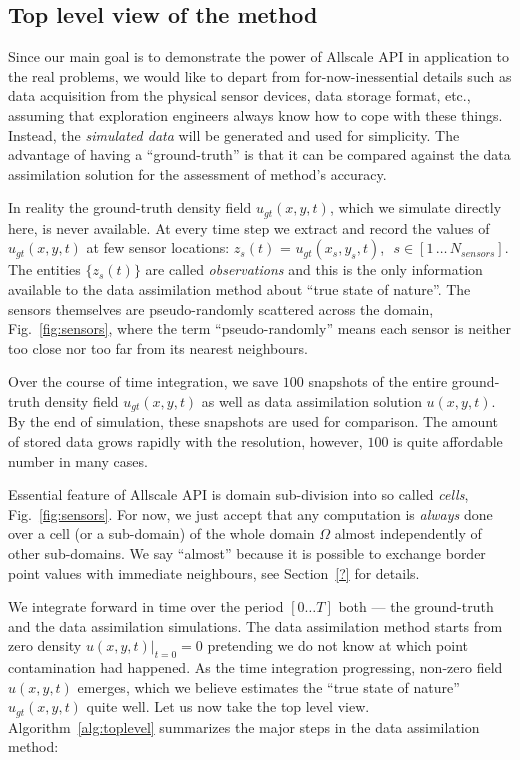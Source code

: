 \documentclass[acmsmall,review,anonymous]{acmart}\settopmatter{printfolios=true,printccs=false,printacmref=false}
\begin{document}
\subsection{Top level view of the method}

Since our main goal is to demonstrate the power of Allscale API in application to the real problems, we would like to depart from for-now-inessential details such as data acquisition from the physical sensor devices, data storage format, etc., assuming that exploration engineers always know how to cope with these things. Instead, the \textit{simulated data} will be generated and used for simplicity. The advantage of having a ``ground-truth'' is that it can be compared against the data assimilation solution for the assessment of method's accuracy.

In reality the ground-truth density field $u_{gt}(x,y,t)$, which we simulate directly here, is never available. At every time step we extract and record the values of $u_{gt}(x,y,t)$ at few sensor locations: $z_s(t)$ = $u_{gt}(x_s,y_s,t)$, $\,\,s \in [1\,{\ldots}\,N_{sensors}]$. The entities $\{z_s(t)\}$ are called \textit{observations} and this is the only information available to the data assimilation method about ``true state of nature''. The sensors themselves are pseudo-randomly scattered across the domain, Fig.~\ref{fig:sensors}, where the term ``pseudo-randomly'' means each sensor is neither too close nor too far from its nearest neighbours.

Over the course of time integration, we save $100$ snapshots of the entire ground-truth density field $u_{gt}(x,y,t)$ as well as data assimilation solution $u(x,y,t)$. By the end of simulation, these snapshots are used for comparison. The amount of stored data grows rapidly with the resolution, however, $100$ is quite affordable number in many cases.    

Essential feature of Allscale API is domain sub-division into so called \textit{cells}, Fig.~\ref{fig:sensors}. For now, we just accept that any computation is \textit{always} done over a cell (or a sub-domain) of the whole domain $\Omega$ almost independently of other sub-domains. We say ``almost'' because it is possible to exchange border point values with immediate neighbours, see Section~\ref{?} for details. 

We integrate forward in time over the period $[0 \ldots T]$ both --- the ground-truth and the data assimilation simulations. The data assimilation method starts from zero density $u(x,y,t)\rvert_{t=0} = 0$ pretending we do not know at which point contamination had happened. As the time integration progressing, non-zero field $u(x,y,t)$ emerges, which we believe estimates the ``true state of nature'' $u_{gt}(x,y,t)$ quite well. Let us now take the top level view. Algorithm~\ref{alg:toplevel} summarizes the major steps in the data assimilation method:
\end{document}
